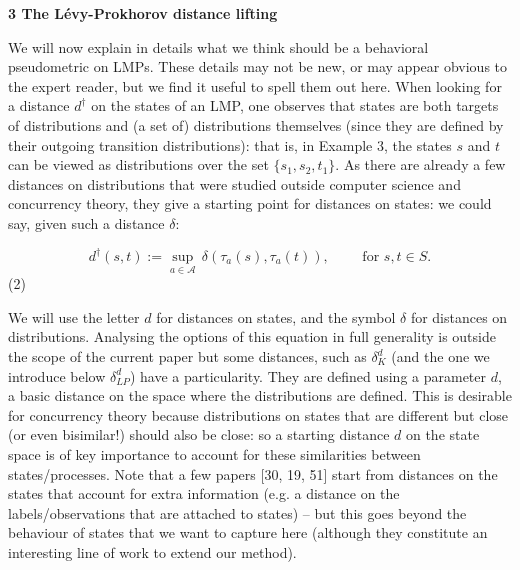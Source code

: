  
 


 
\par\medskip\noindent\textbf{3 The Lévy-Prokhorov distance lifting}\par
 
 
We will now explain in details what we think should be a behavioral pseudometric on LMPs. These details may not be new, or may appear obvious to the expert reader, but we find it useful to spell them out here. When looking for a distance $d^{\dagger}$ on the states of an LMP, one observes that states are both targets of distributions and (a set of) distributions themselves (since they are defined by their outgoing transition distributions): that is, in Example 3, the states $s$ and $t$ can be viewed as distributions over the set $\{s_{1},s_{2},t_{1}\}$. As there are already a few distances on distributions that were studied outside computer science and concurrency theory, they give a starting point for distances on states: we could say, given such a distance $\delta$:\par
  
\par  \quad  \[d^{\dagger}(s,t):=\sup_{a\in\mathcal{A}}\,\delta(\tau_{a}(s),\tau_{a}(t)),\qquad\mbox{ for $s,t\in S$.}\]\quad  \quad  (2)\quad  
  
We will use the letter $d$ for distances on states, and the symbol $\delta$ for distances on distributions. Analysing the options of this equation in full generality is outside the scope of the current paper but some distances, such as $\delta_{K}^{d}$ (and the one we introduce below $\delta^{d}_{LP}$) have a particularity. They are defined using a parameter $d$, a basic distance on the space where the distributions are defined. This is desirable for concurrency theory because distributions on states that are different but close (or even bisimilar!) should also be close: so a starting distance $d$ on the state space is of key importance to account for these similarities between states/processes. Note that a few papers [30, 19, 51] start from distances on the states that account for extra information (e.g. a distance on the labels/observations that are attached to states) – but this goes beyond the behaviour of states that we want to capture here (although they constitute an interesting line of work to extend our method).\par
 

